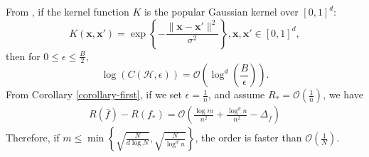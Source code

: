 \documentclass{article}
\begin{document}
From \cite{zhou2002covering}, if the kernel function $K$ is the popular Gaussian kernel over $[0,1]^d$:
$$
  K(\mathbf x,\mathbf x')=\exp\left\{-\frac{\|\mathbf x-\mathbf x'\|^2}{\sigma^2}\right\}, \mathbf x,\mathbf x' \in[0,1]^d,
$$
then for $0\leq \epsilon\leq \frac{B}{2}$,
$$
 \log \left(C(\mathcal{H},\epsilon)\right)=\mathcal{O}\left(\log^d\left(\frac{B}{\epsilon}\right)\right).$$
From Corollary \ref{corollary-first}, if we set $\epsilon=\frac{1}{n}$, and assume $R_\ast=\mathcal{O}\left(\frac{1}{n}\right)$,
we have
\begin{align*}
  R(\bar{f})-R(f_\ast)=\mathcal{O}\left(\frac{\log m}{n^2}+\frac{\log^d n}{n^2}-
  \Delta_{\bar{f}}\right)
\end{align*}
Therefore, if $m\leq \min\left\{\sqrt{\frac{N}{d\log N}}, \sqrt{\frac{N}{\log^d n}}\right\}$,
the order is faster than $\mathcal{O}\left(\frac{1}{N}\right)$.
\end{document}
